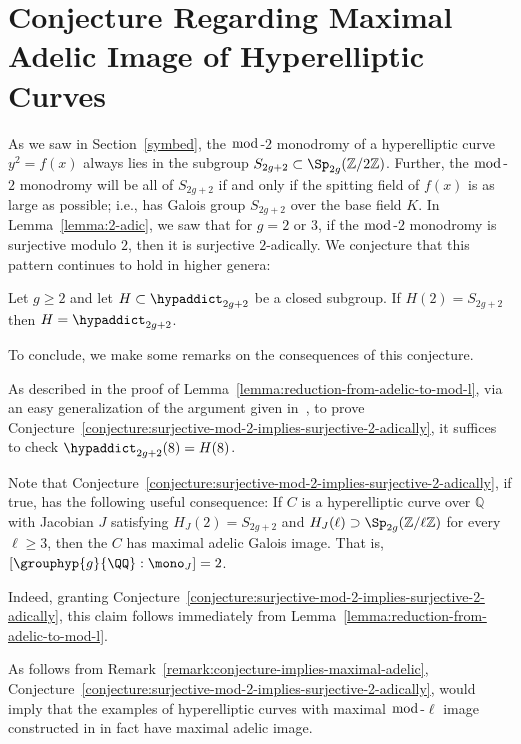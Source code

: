 \section{Conjecture Regarding Maximal Adelic Image of Hyperelliptic Curves}

As we saw in Section~\ref{symbed}, the $\bmod$-$2$ monodromy of a hyperelliptic
curve $y^2 = f(x)$ always lies in the subgroup $S_{2g+2} \subset \Sp_{2g}(\mathbb Z/2 \mathbb Z)$. Further, the $\bmod$-$2$ monodromy will be all of $S_{2g+2}$
if and only if the spitting field of $f(x)$ is as large as possible;
i.e., has Galois group $S_{2g+2}$ over the base field $K$.
In Lemma~\ref{lemma:2-adic}, we saw that for $g = 2$ or $3$,
if the $\bmod$-$2$ monodromy is surjective modulo $2$, then it is surjective
$2$-adically. We conjecture that this pattern continues to hold in higher
genera:
\begin{conjecture}
	\label{conjecture:surjective-mod-2-implies-surjective-2-adically}
	Let $g \geq 2$ and let $H \subset \hypaddict_{2g+2}$ be a closed
	subgroup. If $H(2) = S_{2g+2}$ then $H = \hypaddict_{2g+2}$.
\end{conjecture}
To conclude, we make some remarks on the consequences of this conjecture.
\begin{remark}
	\label{remark:}
	As described in the proof of Lemma~\ref{lemma:reduction-from-adelic-to-mod-l},
	via an easy generalization of the argument given 
	in~\cite[Lemma 3, Section IV.3.4]{serre1989abelian},
	to prove
	Conjecture~\ref{conjecture:surjective-mod-2-implies-surjective-2-adically},
	it suffices to check $\hypaddict_{2g+2}(8) = H(8)$.
\end{remark}
\begin{remark}
	\label{remark:conjecture-implies-maximal-adelic}
Note that Conjecture~\ref{conjecture:surjective-mod-2-implies-surjective-2-adically}, if true, has the following useful consequence:
If $C$ is a hyperelliptic curve over $\mathbb Q$ with Jacobian $J$ satisfying
$H_J(2) = S_{2g+2}$ and $H_J(\ell) \supset \Sp_{2g}(\mathbb Z/\ell \mathbb Z)$
for every $\ell \geq 3$, then the $C$ has maximal adelic Galois image.
That is, $[\grouphyp{g}{\QQ} : \mono_J] = 2$.

Indeed, granting Conjecture~\ref{conjecture:surjective-mod-2-implies-surjective-2-adically}, this claim follows immediately from Lemma~\ref{lemma:reduction-from-adelic-to-mod-l}.
\end{remark}
\begin{remark}
	\label{remark:anni-maximal-adelic-examples}
	As follows from Remark~\ref{remark:conjecture-implies-maximal-adelic},
	Conjecture~\ref{conjecture:surjective-mod-2-implies-surjective-2-adically}, would imply that the examples of hyperelliptic
curves with maximal $\bmod$-$\ell$ image constructed in 
\cite[Theorem 7.1]{anni2016residual} in fact have maximal adelic image.
\end{remark}


